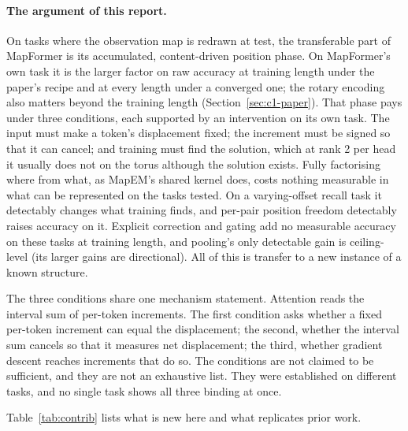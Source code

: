\documentclass[10pt]{article}
\begin{document}
\paragraph{The argument of this report.} On tasks where the observation map is redrawn at test, the
transferable part of MapFormer is its accumulated, content-driven position phase. On MapFormer's own task
it is the larger factor on raw accuracy at training length under the paper's recipe and at every length
under a converged one; the rotary encoding also matters beyond the training length (Section~\ref{sec:c1-paper}). That phase pays under three
conditions, each supported by an intervention on its own task. The
input must make a token's displacement fixed; the increment must be signed so
that it can cancel; and training must find the solution, which at rank 2 per head it usually does not on
the torus although the solution exists. Fully factorising where from what, as
MapEM's shared kernel does, costs nothing measurable in what can be represented on the tasks tested.
On a varying-offset recall task it detectably changes what training finds, and per-pair position
freedom detectably raises accuracy on it. Explicit correction and gating add no measurable
accuracy on these tasks at training length, and pooling's only detectable gain is ceiling-level (its larger gains are directional). All of this is transfer to a new instance of a known
structure.

The three conditions share one mechanism statement. Attention reads the interval sum of per-token
increments. The first condition asks whether a fixed per-token increment can equal the displacement;
the second, whether the interval sum cancels so that it measures net displacement; the third,
whether gradient descent reaches increments that do so. The conditions are not claimed to be
sufficient, and they are not an exhaustive list. They were established on different tasks, and no
single task shows all three binding at once.

Table~\ref{tab:contrib} lists what is new here and what replicates prior work.
\end{document}
